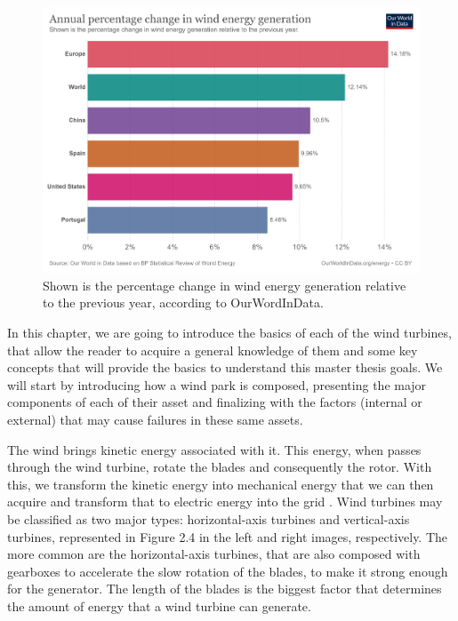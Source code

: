 \begin{figure}[htbp]
	\centering
	\includegraphics[width=\textwidth]{Chapters/Figures/background_fig4.PNG}
	\caption{Shown is the percentage change in wind energy generation relative to the previous year, according to OurWordInData. \cite{OLD_33_GENERAL} }
	\label{fig:Figuras_Tree_silhouettes-vectorial}
\end{figure}


In this chapter, we are going to introduce the basics of each of the wind turbines, that allow the reader to acquire a general knowledge of them and some key concepts that will provide the basics to understand this master thesis goals. We will start by introducing how a wind park is composed, presenting the major components of each of their asset and finalizing with the factors (internal or external) that may cause failures in these same assets.


The wind brings kinetic energy associated with it. This energy, when passes through the wind turbine, rotate the blades and consequently the rotor. With this, we transform the kinetic energy into mechanical energy that we can then acquire and transform that to electric energy into the grid \cite{OLD_29_WIND} \cite{OLD_31}.
Wind turbines may be classified as two major types: horizontal-axis turbines and vertical-axis turbines, represented in Figure 2.4 in the left and right images, respectively. The more common are the horizontal-axis turbines, that are also composed with gearboxes to accelerate the slow rotation of the blades, to make it strong enough for the generator. The length of the blades is the biggest factor that determines the amount of energy that a wind turbine can generate.

